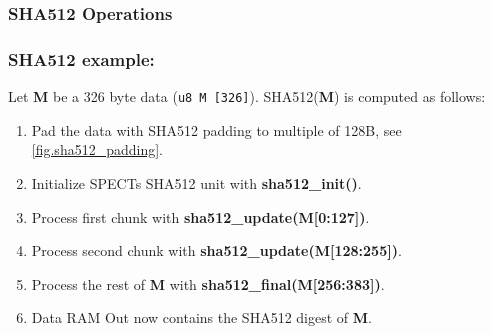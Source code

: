 \documentclass[notconfidential]{tropic_design_spec}
\begin{document}
\subsubsection*{SHA512 Operations}




\pagebreak

\subsubsection*{SHA512 example:}

Let \textbf{M} be a 326 byte data (\texttt{u8 M [326]}). SHA512(\textbf{M}) is computed as follows:

\begin{enumerate}
    \item Pad the data with SHA512 padding to multiple of 128B, see \ref{fig.sha512_padding}.
    \item Initialize SPECTs SHA512 unit with \textbf{sha512_init()}.
    \item Process first chunk with \textbf{sha512_update(M[0:127])}.
    \item Process second chunk with \textbf{sha512_update(M[128:255])}.
    \item Process the rest of \textbf{M} with \textbf{sha512_final(M[256:383])}.
    \item Data RAM Out now contains the SHA512 digest of \textbf{M}.
\end{enumerate}
\end{document}
